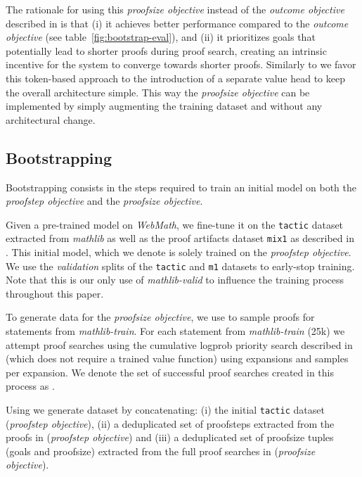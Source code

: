 \documentclass[nohyperref]{article}
\theoremstyle{plain}
\theoremstyle{definition}
\theoremstyle{remark}
\begin{document}
The rationale for using this \textit{proofsize objective} instead of the \textit{outcome objective} described in \citet{polu2020generative} is that (i) it achieves better performance compared to the \textit{outcome objective} (see table~\ref{fig:bootstrap-eval}), and (ii) it prioritizes goals that potentially lead to shorter proofs during proof search, creating an intrinsic incentive for the system to converge towards shorter proofs. Similarly to \citet{polu2020generative} we favor this token-based approach to the introduction of a separate value head to keep the overall architecture simple. This way the \textit{proofsize objective} can be implemented by simply augmenting the training dataset and without any architectural change.



\subsection{Bootstrapping}
\label{boostrapping}

Bootstrapping consists in the steps required to train an initial model on both the \textit{proofstep objective} and the \textit{proofsize objective}.

Given a pre-trained model on \textit{WebMath}, we fine-tune it on the \texttt{tactic} dataset extracted from \textit{mathlib} as well as the proof artifacts dataset \texttt{mix1} as described in \citet{han2021proof}. This initial model, which we denote  is solely trained on the \textit{proofstep objective}. We use the \textit{validation} splits of the \texttt{tactic} and \texttt{m1} datasets to early-stop training. Note that this is our only use of \textit{mathlib-valid} to influence the training process throughout this paper.

To generate data for the \textit{proofsize objective}, we use  to sample proofs for statements from \textit{mathlib-train}. For each statement from \textit{mathlib-train} (25k) we attempt  proof searches using the cumulative logprob priority search described in \citet{polu2020generative} (which does not require a trained value function) using  expansions and  samples per expansion. We denote the set of successful proof searches created in this process as .

Using  we generate dataset  by concatenating: (i) the initial \texttt{tactic} dataset (\textit{proofstep objective}), (ii) a deduplicated set of proofsteps extracted from the proofs in  (\textit{proofstep objective}) and (iii) a deduplicated set of proofsize tuples (goals and proofsize) extracted from the full proof searches in  (\textit{proofsize objective}).
\end{document}
